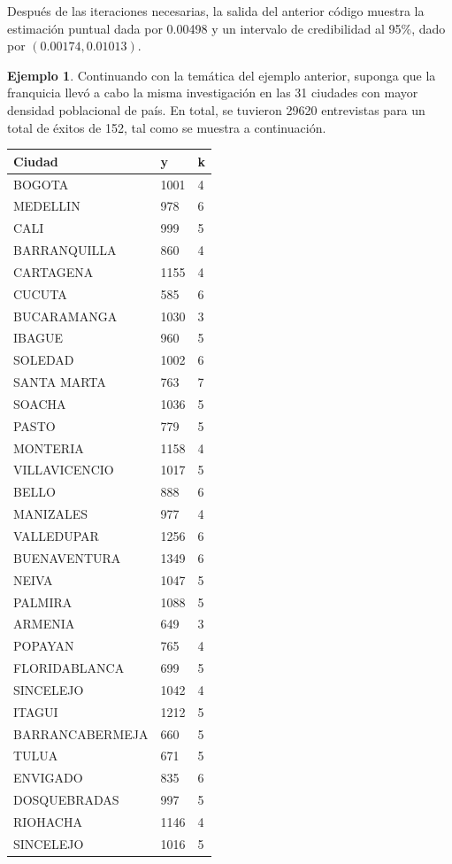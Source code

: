 \documentclass[
  10pt,
  spanish,
]{book}
\theoremstyle{definition}
\theoremstyle{definition}
\newtheorem{example}{Ejemplo}[chapter]
\theoremstyle{definition}
\theoremstyle{definition}
\theoremstyle{remark}
\begin{document}
Después de las iteraciones necesarias, la salida del anterior código muestra la estimación puntual dada por 0.00498 y un intervalo de credibilidad al 95\%, dado por \((0.00174, 0.01013)\).

\begin{example}
\protect\hypertarget{exm:binnegex}{}{\label{exm:binnegex} }Continuando con la temática del ejemplo anterior, suponga que la franquicia llevó a cabo la misma investigación en las 31 ciudades con mayor densidad poblacional de país. En total, se tuvieron 29620 entrevistas para un total de éxitos de 152, tal como se muestra a continuación.

\begin{longtable}[]{@{}lll@{}}
\toprule
Ciudad & y & k \\
\midrule
\endhead
BOGOTA & 1001 & 4 \\
MEDELLIN & 978 & 6 \\
CALI & 999 & 5 \\
BARRANQUILLA & 860 & 4 \\
CARTAGENA & 1155 & 4 \\
CUCUTA & 585 & 6 \\
BUCARAMANGA & 1030 & 3 \\
IBAGUE & 960 & 5 \\
SOLEDAD & 1002 & 6 \\
SANTA MARTA & 763 & 7 \\
SOACHA & 1036 & 5 \\
PASTO & 779 & 5 \\
MONTERIA & 1158 & 4 \\
VILLAVICENCIO & 1017 & 5 \\
BELLO & 888 & 6 \\
MANIZALES & 977 & 4 \\
VALLEDUPAR & 1256 & 6 \\
BUENAVENTURA & 1349 & 6 \\
NEIVA & 1047 & 5 \\
PALMIRA & 1088 & 5 \\
ARMENIA & 649 & 3 \\
POPAYAN & 765 & 4 \\
FLORIDABLANCA & 699 & 5 \\
SINCELEJO & 1042 & 4 \\
ITAGUI & 1212 & 5 \\
BARRANCABERMEJA & 660 & 5 \\
TULUA & 671 & 5 \\
ENVIGADO & 835 & 6 \\
DOSQUEBRADAS & 997 & 5 \\
RIOHACHA & 1146 & 4 \\
SINCELEJO & 1016 & 5 \\
\bottomrule
\end{longtable}


\end{example}
\end{document}
